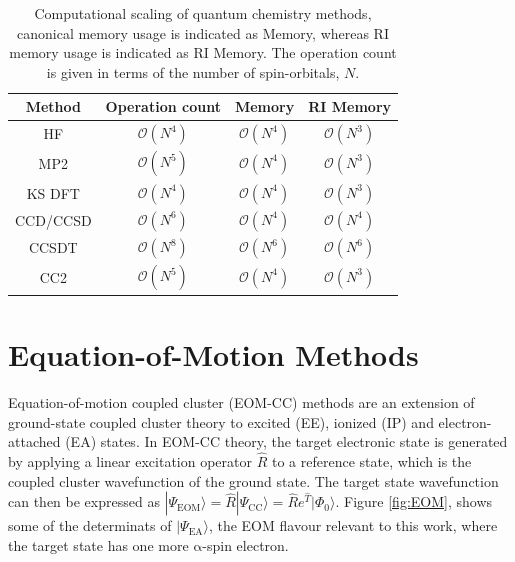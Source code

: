 \begin{table}[h!]
    \centering
    \caption[Computational Scaling of selected Methods]{Computational scaling of quantum chemistry methods, canonical memory usage is indicated as Memory, whereas RI memory usage is indicated as RI Memory. The operation count is given in terms of the number of spin-orbitals, $N$.}
    \label{tab:qc_scaling}
    \begin{tabular}{cccc}
        \toprule
        Method & Operation count & Memory & RI Memory \\
        \midrule
        HF & $\mathcal{O}(N^4)$ & $\mathcal{O}(N^4)$ & $\mathcal{O}(N^3)$ \\
        MP2 & $\mathcal{O}(N^5)$ & $\mathcal{O}(N^4)$ & $\mathcal{O}(N^3)$ \\ 
        KS DFT & $\mathcal{O}(N^4)$ & $\mathcal{O}(N^4)$ & $\mathcal{O}(N^3)$ \\ 
        CCD/CCSD & $\mathcal{O}(N^6)$ & $\mathcal{O}(N^4)$ & $\mathcal{O}(N^4)$ \\
        CCSDT & $\mathcal{O}(N^8)$ & $\mathcal{O}(N^6)$ & $\mathcal{O}(N^6)$ \\
        CC2 & $\mathcal{O}(N^{5})$ & $\mathcal{O}(N^4)$ & $\mathcal{O}(N^3)$ \\
        \bottomrule
    \end{tabular}
\end{table}

\section{Equation-of-Motion Methods} \label{sec:eom_theory}
Equation-of-motion coupled cluster (EOM-CC) methods\cite{emrich1981extension,stanton1993equation,krylov2008equation} are an extension of ground-state coupled cluster theory to excited (EE), ionized (IP) and electron-attached (EA) states. In EOM-CC theory, the target electronic state is generated by applying a linear excitation operator $\hat{R}$ to a reference state, which is the coupled cluster wavefunction of the ground state. The target state wavefunction can then be expressed as $|\Psi_{\mathrm{EOM}}\rangle = \hat{R} |\Psi_{\mathrm{CC}}\rangle = \hat{R} e^{\hat{T}} |\Phi_{\mathrm{0}}\rangle$. Figure \ref{fig:EOM}, shows some of the determinats of $| \Psi_{\mathrm{EA}} \rangle$, the EOM flavour relevant to this work, where the target state has one more $\mathrm{\alpha}$-spin electron. \\

